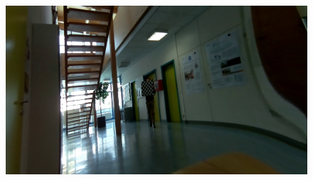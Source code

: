 \begin{figure}[H]
\begin{minipage}[t]{0.24\textwidth}
     \end{minipage}%
     \begin{minipage}[t]{0.24\textwidth}
        \centering
        \includegraphics[width=.95\textwidth]{image/3/rec_2/525_undist.png}
     \end{minipage}
     
     \hfill
     

\end{figure}
